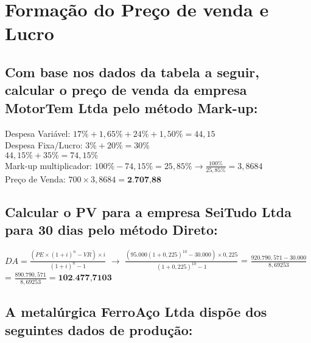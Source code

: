\documentclass[report]{uftex}
\begin{document}
\chapter{Formação do Preço de venda e Lucro}

\section{ Com base nos dados da tabela a seguir, calcular o preço de venda da empresa MotorTem Ltda pelo método Mark-up:}

Despesa Variável: $17\% + 1,65\% + 24\% + 1,50\% = 44,15$ \\ 
Despesa Fixa/Lucro: $3\% + 20\% = 30\%$ \\
$44,15\% + 35\% = 74,15\%$  \\
Mark-up multiplicador: $100\% - 74,15\% = 25,85\% \rightarrow \frac{100\%}{25,85\%} = 3,8684$ \\
Preço de Venda: $700 \times 3,8684 = \textbf{2.707,88}$ 

\section{ Calcular o PV para a empresa SeiTudo Ltda para 30 dias pelo método Direto:}

$DA = \frac{(PE \times (1+i)^n - VR) \times i}{(1+i)^n -1}$ $\rightarrow$ $\frac{(95.000(1+0,225)^{10}-30.000) \times 0,225}{(1+0,225)^{10}-1}$ = $\frac{920.790,571 - 30.000}{8,69253}$ = $\frac{890.790,571}{8,69253} = \textbf{102.477,7103}$

\section{A metalúrgica FerroAço Ltda dispõe dos seguintes dados de produção:}
\end{document}
